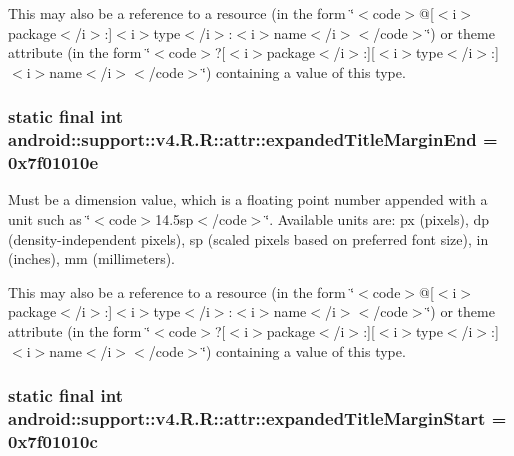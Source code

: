 This may also be a reference to a resource (in the form \char`\"{}$<$code$>$@\mbox{[}$<$i$>$package$<$/i$>$:\mbox{]}$<$i$>$type$<$/i$>$:$<$i$>$name$<$/i$>$$<$/code$>$\char`\"{}) or theme attribute (in the form \char`\"{}$<$code$>$?\mbox{[}$<$i$>$package$<$/i$>$:\mbox{]}\mbox{[}$<$i$>$type$<$/i$>$:\mbox{]}$<$i$>$name$<$/i$>$$<$/code$>$\char`\"{}) containing a value of this type. \hypertarget{classandroid_1_1support_1_1v4_1_1_r_1_1attr_b85d1b1d258e60585cb490e72403d5f9}{
\subsubsection[{expandedTitleMarginEnd}]{\setlength{\rightskip}{0pt plus 5cm}static final int android::support::v4.R.R::attr::expandedTitleMarginEnd = 0x7f01010e}}
\label{classandroid_1_1support_1_1v4_1_1_r_1_1attr_b85d1b1d258e60585cb490e72403d5f9}


Must be a dimension value, which is a floating point number appended with a unit such as \char`\"{}$<$code$>$14.5sp$<$/code$>$\char`\"{}. Available units are: px (pixels), dp (density-independent pixels), sp (scaled pixels based on preferred font size), in (inches), mm (millimeters). 

This may also be a reference to a resource (in the form \char`\"{}$<$code$>$@\mbox{[}$<$i$>$package$<$/i$>$:\mbox{]}$<$i$>$type$<$/i$>$:$<$i$>$name$<$/i$>$$<$/code$>$\char`\"{}) or theme attribute (in the form \char`\"{}$<$code$>$?\mbox{[}$<$i$>$package$<$/i$>$:\mbox{]}\mbox{[}$<$i$>$type$<$/i$>$:\mbox{]}$<$i$>$name$<$/i$>$$<$/code$>$\char`\"{}) containing a value of this type. \hypertarget{classandroid_1_1support_1_1v4_1_1_r_1_1attr_8902290698ddfd5d24e6584d27277844}{
\subsubsection[{expandedTitleMarginStart}]{\setlength{\rightskip}{0pt plus 5cm}static final int android::support::v4.R.R::attr::expandedTitleMarginStart = 0x7f01010c}}
\label{classandroid_1_1support_1_1v4_1_1_r_1_1attr_8902290698ddfd5d24e6584d27277844}


